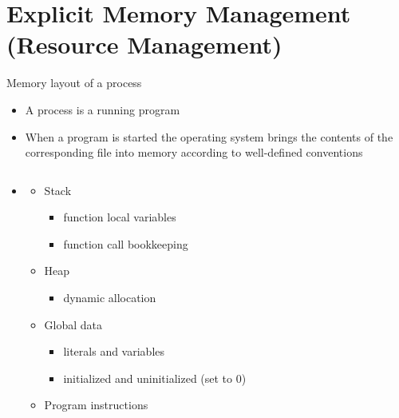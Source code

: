 

\section*{Explicit Memory Management\\(Resource Management)}

\begin{frame}{Memory layout of a process}

  \begin{itemize}
  \item A process is a running program
  \item When a program is started the operating system brings the contents of
    the corresponding file into memory according to well-defined conventions
  \end{itemize}

  \begin{columns}
    \begin{column}{.7\textwidth}
      \begin{itemize}
        \item[]
      \begin{itemize}
      \item Stack
        \begin{itemize}
        \item function local variables
        \item function call bookkeeping
        \end{itemize}
      \item Heap
        \begin{itemize}
        \item dynamic allocation
        \end{itemize}
      \item Global data
        \begin{itemize}
        \item literals and variables
        \item initialized and uninitialized (set to 0)
        \end{itemize}
      \item Program instructions
      \end{itemize}
    \end{itemize}
  \end{column}


\end{columns}
\end{frame}
